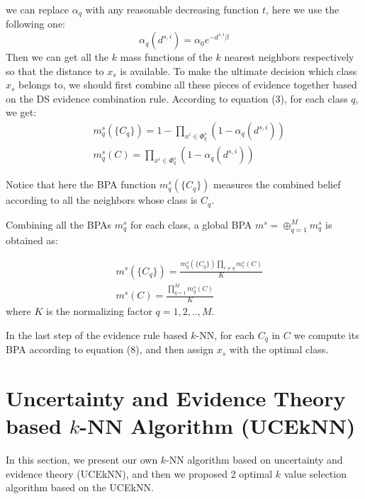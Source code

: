 \documentclass[runningheads]{llncs}
\begin{document}
we can replace $\alpha _q$ with any reasonable decreasing function $t$, here we use the following one:
\begin{equation}
\alpha_q (d^{s,i})= \alpha_0 e^{- d^{s,i} {\beta}}
\end{equation}
Then we can get all the $k$ mass functions of the $k$ nearest neighbors respectively so that the distance to $x_s$ is available. To make the ultimate decision which class $x_s$ belongs to, we should first combine all these pieces of evidence together based on the DS evidence combination rule. According to equation (3), for each class $q$, we get:
\begin{equation}
\begin{split}
&\ m^{s} _q( \{C_q\}) = 1- \prod_{x^i\in \Phi^s _q } (1-\alpha_q(d^{s,i}))
\\
&\ m^{s} _q(C) = \prod_{x^i\in \Phi^s _q } (1-\alpha_q(d^{s,i}))
\end{split}
\end{equation}

Notice that here the BPA function $m^s_q (\{ C_q \})$ measures the combined belief according to all the neighbors whose class is $C_q$.

Combining all the BPAs $m^s_q$ for each class, a global BPA $m^s=\oplus ^M _{q=1} m^s_q$ is obtained as:

\begin{equation}
\begin{split}
&\ m^{s} ( \{C_q\}) = \frac{m^{s}_q ( \{C_q\})
\prod_{r\neq q} m^s_r(C)}{K}
\\
&\ m^{s} ( C) = \frac{
\prod_{q=1} ^M m^s_q(C)}{K}
\end{split}
\end{equation}
where $K$ is the normalizing factor $q=1,2,..,M$.

In the last step of the evidence rule based $k$-NN, for each $C_q$ in $C$ we compute its BPA according to equation (8), and then assign $x_s$ with the optimal class. 

\section{Uncertainty and Evidence Theory based $k$-NN Algorithm (UCEkNN)}

In this section, we present our own $k$-NN algorithm based on uncertainty and evidence theory (UCEkNN), and then we proposed 2 optimal $k$ value selection algorithm based on the UCEkNN.
\end{document}
